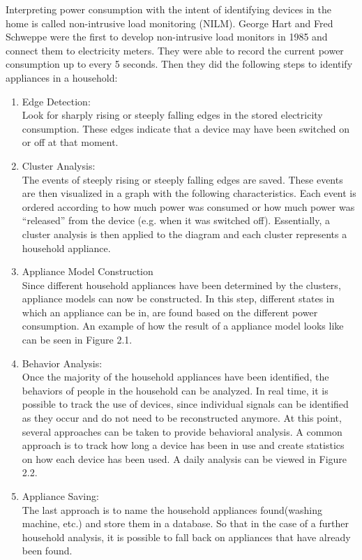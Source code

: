 Interpreting power consumption with the intent of identifying devices in the home is called non-intrusive load monitoring (NILM). George Hart and Fred Schweppe were the first to develop non-intrusive load monitors in 1985 and connect them to electricity meters. They were able to record the current power consumption up to every 5 seconds. Then they did the following steps to identify appliances in a household:
\begin{enumerate}
\item Edge Detection:\\
Look for sharply rising or steeply falling edges in the stored electricity consumption. These edges indicate that a device may have been switched on or off at that moment.
\item Cluster Analysis:\\ 
The events of steeply rising or steeply falling edges are saved. These events are then visualized in a graph with the following characteristics. Each event is ordered according to how much power was consumed or how much power was 	``released'' from the device (e.g. when it was switched off).
Essentially, a cluster analysis is then applied to the diagram and each  cluster represents a household appliance.
\item Appliance Model Construction\\
Since different household appliances have been determined by the clusters, appliance models can now be constructed. In this step, different states in which an appliance can be in, are found based on the different power consumption. An example of how the result of a appliance model looks like can be seen in Figure 2.1.
\item Behavior Analysis:\\
Once the majority of the household appliances have been identified, the behaviors of people in the household can be analyzed. In real time, it is possible to track the use of devices, since individual signals can be identified as they occur and do not need to be reconstructed anymore.
At this point, several approaches can be taken to provide behavioral analysis. A common approach is to track how long a device has been in use and create statistics on how each device has been used. A daily analysis can be viewed in Figure 2.2.
\item Appliance Saving:\\
The last approach is to name the household appliances found(washing machine, etc.) and store them in a database. So that in the case of a further household analysis, it is possible to fall back on appliances that have already been found.
\end{enumerate}
